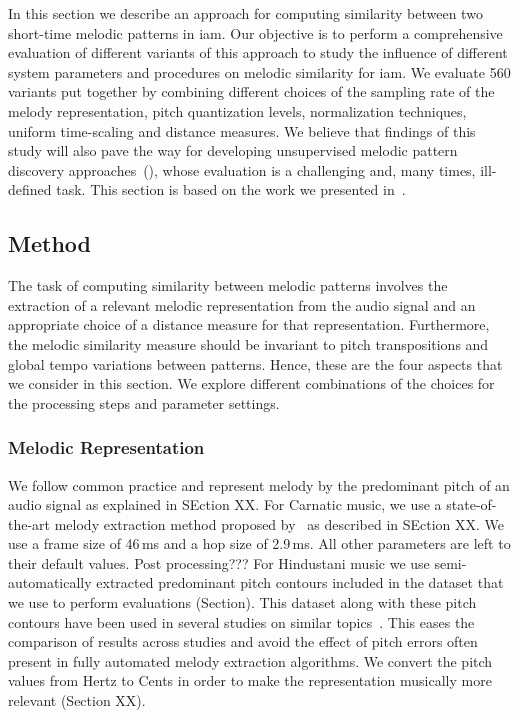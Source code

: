 In this section we describe an  approach for computing similarity between two short-time melodic patterns in \gls{iam}. Our objective is to perform a comprehensive evaluation of different variants of this approach to study the influence of different system parameters and procedures on melodic similarity for \gls{iam}. We evaluate 560 variants put together by combining different choices of the sampling rate of the melody representation, pitch quantization levels, normalization techniques, uniform time-scaling and distance measures. We believe that findings of this study will also pave the way for developing unsupervised melodic pattern discovery approaches~(), whose evaluation is a challenging and, many times, ill-defined task. This section is based on the work we presented in~\cite{gulati_ICASSP2015}.

\subsection{Method}
The task of computing similarity between melodic patterns involves the extraction of a relevant melodic representation from the audio signal and an appropriate choice of a distance measure for that representation. Furthermore, the melodic similarity measure should be invariant to pitch transpositions and global tempo variations between patterns. Hence, these are the four aspects that we consider in this section. We explore different combinations of the choices for the processing steps and parameter settings.


\subsubsection{Melodic Representation}
\label{sec:patterns_melodic_similarity_representation}

We follow common practice and represent melody by the predominant pitch of an audio signal as explained in SEction XX. For Carnatic music, we use a state-of-the-art melody extraction method proposed by~\cite{Salamon2012} as described in SEction XX. We use a frame size of 46\,ms and a hop size of 2.9\,ms. All other parameters are left to their default values. Post processing??? For Hindustani music we use semi-automatically extracted predominant pitch contours included in the dataset that we use to perform evaluations (Section). This dataset along with these pitch contours have been used in several studies on similar topics~\citep{Rao2014, Ross2012b, Ross2012}. This eases the comparison of results across studies and avoid the effect of pitch errors often present in fully automated melody extraction algorithms. We convert the pitch values from Hertz to Cents in order to make the representation musically more relevant (Section XX).

